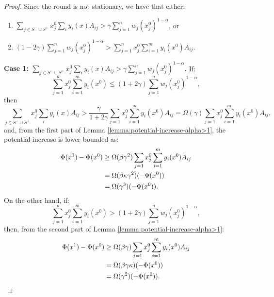\documentclass[11pt]{article}
\begin{document}
\begin{proof}
Since the round is not stationary, we have that either: 
\begin{enumerate}
\item $\sum_{j\in S^-\cup S^+}x_j^0\sum_i y_i(x)A_{ij} > \gamma \sum_{j=1}^n w_j (x_j^0)^{1-\alpha}$, or
\item $(1-2\gamma)\sum_{j=1}^n w_j(x_j^0)^{1-\alpha} > \sum_{j=1}^n x_j^0 \sum_{i=1}^m y_i(x^0)A_{ij}$.
\end{enumerate}
\noindent\textbf{Case 1: $\sum_{j\in S^-\cup S^+}x_j^0\sum_i y_i(x)A_{ij} > \gamma \sum_{j=1}^n w_j (x_j^0)^{1-\alpha}$.} If: 
\begin{equation*}\sum_{j=1}^n x_j^0 \sum_{i=1}^m y_i(x^0)\leq (1+2\gamma)\sum_{j=1}^n w_j (x_j^0)^{1-\alpha},
\end{equation*}
then
\begin{equation*}
\sum_{j\in S^-\cup S^+}x_j^0\sum_i y_i(x)A_{ij} > \frac{\gamma}{1+2\gamma}\sum_{j=1}x_j^0 \sum_{i=1}^m y_i(x^0)A_{ij} = \Omega(\gamma)\sum_{j=1}x_j^0 \sum_{i=1}^m y_i(x^0)A_{ij},
\end{equation*}
and, from the first part of Lemma \ref{lemma:potential-increase-alpha>1}, the potential increase is lower bounded as:
\begin{align}
\Phi(x^1) - \Phi(x^0) &\geq \Omega(\beta\gamma^2) \sum_{j=1}x_j^0 \sum_{i=1}^m y_i(x^0)A_{ij}\notag\\
&= \Omega(\beta\kappa\gamma^2) (-\Phi(x^0))\notag\\
&= \Omega(\gamma^3)(-\Phi(x^0)). \notag \end{align}
On the other hand, if:
\begin{equation*}
\sum_{j=1}^n x_j^0 \sum_{i=1}^m y_i(x^0)>(1+2\gamma)\sum_{j=1}^n w_j (x_j^0)^{1-\alpha},
\end{equation*}
then, from the second part of Lemma \ref{lemma:potential-increase-alpha>1}:
\begin{align}
\Phi(x^1) - \Phi(x^0) &\geq \Omega(\beta\gamma)\sum_{j=1}x_j^0 \sum_{i=1}^m y_i(x^0)A_{ij}\notag\\
&= \Omega(\beta\gamma\kappa)(-\Phi(x^0))\notag\\
&= \Omega(\gamma^2)(-\Phi(x^0)). \notag \end{align}


\end{proof}
\end{document}

